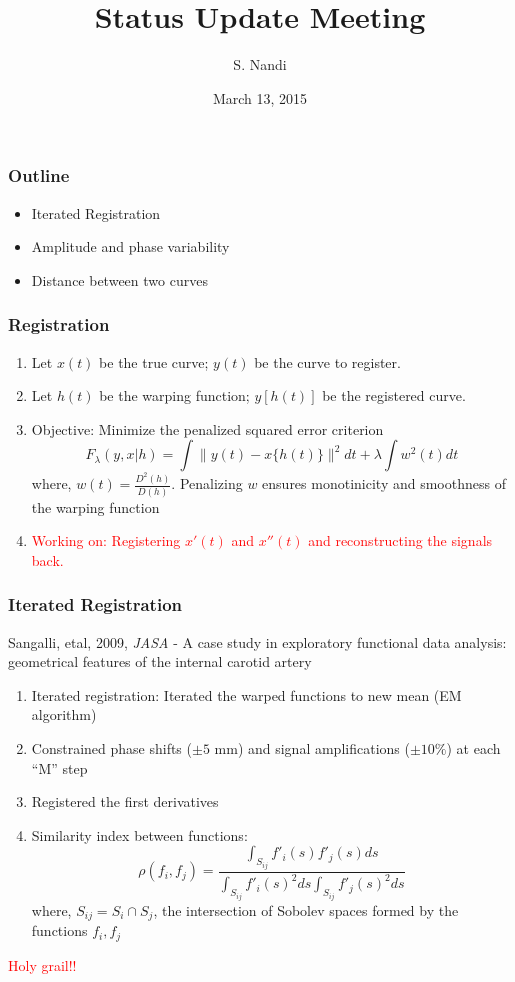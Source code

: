 \documentclass[10pt,dvipsnames,table, handout]{beamer} %
\title[Status Update Mar '15]{Status Update Meeting}
\author{S. Nandi}
\institute[LMCG]{LMCG \\
 University of Wisconsin-Madison}
\date{March 13, 2015}
\begin{document}
\setlength{\baselineskip}{16truept}
\frame{\maketitle}

\begin{frame}
\frametitle{Outline}
\begin{itemize}       
\item Iterated Registration
\item Amplitude and phase variability
\item Distance between two curves
\end{itemize}
\end{frame}

\begin{frame}
\frametitle{Registration}
\begin{enumerate}
\item Let $x(t)$ be the true curve; $y(t)$ be the curve to register. 
\item Let $h(t)$ be the warping function; $y[h(t)]$ be the registered curve.
\item Objective: Minimize the penalized squared error criterion
\[ F_{\lambda}(y, x|h) = \int \| y(t) - x\{h(t)\} \| ^2 dt + \lambda \int w^2 (t)dt \]
where, $w(t) = \frac{D^2(h)}{D(h)}$. Penalizing $w$ ensures monotinicity and smoothness of the warping function
\item \textcolor{red}{Working on: Registering $x'(t)$ and $x''(t)$ and reconstructing the signals back.}
\end{enumerate}
\end{frame}

\begin{frame}
\frametitle{Iterated Registration}
Sangalli, etal, 2009, {\emph{JASA}} - A case study in exploratory functional data analysis: geometrical features of the internal carotid artery
\begin{enumerate}
\item Iterated registration: Iterated the warped functions to new mean (EM algorithm)
\item Constrained phase shifts ($\pm 5$ mm) and signal amplifications ($\pm 10\%$) at each ``M'' step
\item Registered the first derivatives
\item Similarity index between functions:
\[ \rho(f_i, f_j) = \frac{\int _{S_{ij}}f'_i(s)f'_j(s) ds}{\int _{S_{ij}}f'_i(s)^2 ds \int _{S_{ij}}f'_j(s)^2 ds} \]
where, $S_{ij} = S_i \cap S_j$, the intersection of Sobolev spaces formed by the functions $f_i, f_j$
\end{enumerate}
\begin{center}
\textcolor{red}{Holy grail!!}
\end{center}
\end{frame}
\end{document}
